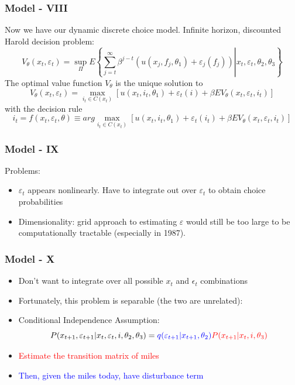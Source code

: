\documentclass{beamer}
\begin{document}
\begin{frame}
\frametitle{Model - VIII}
Now we have our dynamic discrete choice model.  Infinite horizon, discounted Harold decision problem:
\[V_\theta(x_t,\varepsilon_t)=\sup_{\Pi}E\left\{\left.\sum_{j=t}^\infty \beta^{j-t}\left(u(x_j,f_j,\theta_1)+\varepsilon_j(f_j)\right)\right|x_t,\varepsilon_t,\theta_2,\theta_3\right\}\] The optimal value function $V_\theta$ is the unique solution to \[V_\theta(x_t,\varepsilon_t)=\max_{i_t\in C(x_t)}[u(x_t,i_t,\theta_1)+\varepsilon_t(i)+\beta EV_\theta(x_t,\varepsilon_t,i_t)] \] with the decision rule \[i_t=f(x_t,\varepsilon_t,\theta)\equiv arg\max_{i_t\in C(x_t)}[u(x_t,i_t,\theta_1)+\varepsilon_t(i_t)+\beta EV_\theta(x_t,\varepsilon_t,i_t)]\]

\end{frame}

\begin{frame}
\frametitle{Model - IX}
Problems:
\begin{itemize}
\item $\varepsilon_t$ appears nonlinearly. Have to integrate out over $\varepsilon_t$ to obtain choice probabilities
\bigskip
\item  Dimensionality: grid approach to estimating $\varepsilon$ would still be too large to be computationally tractable (especially in 1987). 
\end{itemize}

\end{frame}

\begin{frame}
\frametitle{Model - X}
\begin{itemize}
\item Don't want to integrate over all possible $x_t$ and $\epsilon_t$ combinations
\bigskip
\item Fortunately, this problem is separable (the two are unrelated):
\bigskip
\item Conditional Independence Assumption:
\[P(x_{t+1},\varepsilon_{t+1}|x_t,\varepsilon_t,i,\theta_2,\theta_3)=\textcolor{blue}{q(\varepsilon_{t+1}|x_{t+1},\theta_2)}\textcolor{red}{P(x_{t+1}|x_t,i,\theta_3)}\]
\bigskip
\item \textcolor{red}{Estimate the transition matrix of miles}
\bigskip
\item \textcolor{blue}{Then, given the miles today, have disturbance term}
\end{itemize}
\end{frame}
\end{document}
